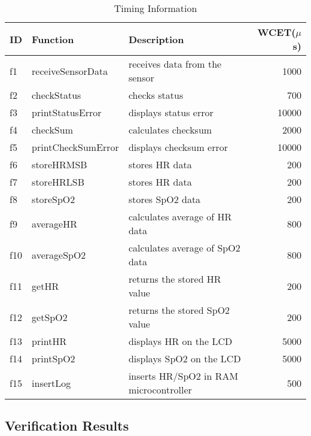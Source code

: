 \documentclass{llncs}
\begin{document}
\renewcommand{\baselinestretch}{1.2}
\setlength{\tabcolsep}{2pt}
\begin{table}[!hbt]
\begin{center}
\caption{Timing Information}
\label{table:deadlines}
\begin{tabular}{l l l r }
\hline
    ID & Function & Description & WCET($\mu$s)   \\
\hline\hline
   f1 & receiveSensorData & receives data from the sensor       & 1000 \\ 
   f2 & checkStatus       & checks status      & 700 \\
   f3 & printStatusError  & displays status error     & 10000 \\
   f4 & checkSum     & calculates checksum & 2000 \\
   f5 & printCheckSumError  & displays checksum error     & 10000 \\
   f6 & storeHRMSB         & stores HR data & 200 \\ 
   f7 & storeHRLSB         & stores HR data & 200 \\ 
   f8 & storeSpO2         & stores SpO2 data & 200 \\ 
   f9 & averageHR        & calculates average of HR data & 800 \\ 
   f10 & averageSpO2      & calculates average of SpO2 data & 800 \\ 
   f11 & getHR             & returns the stored HR value         & 200 \\
   f12 & getSpO2           & returns the stored SpO2 value       & 200 \\   
   f13 & printHR           & displays HR on the LCD & 5000 \\   
   f14 & printSpO2         & displays SpO2 on the LCD & 5000 \\   
   f15 & insertLog         & inserts HR/SpO2 in RAM microcontroller & 500 \\
\hline
\end{tabular}
\end{center}
\end{table}


\subsection{Verification Results}
\end{document}
